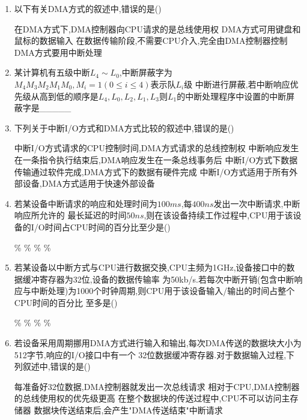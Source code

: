 \documentclass[12pt, a4paper, oneside, UTF8]{ctexbook}
\begin{document}
\begin{enumerate}
    \item 以下有关DMA方式的叙述中,错误的是() 
    \begin{choices}[1]
        \task 在DMA方式下,DMA控制器向CPU请求的是总线使用权 
        \task DMA方式可用键盘和鼠标的数据输入 
        \task 在数据传输阶段,不需要CPU介入,完全由DMA控制器控制 
        \task DMA方式要用中断处理 
    \end{choices}

    \item \bl 某计算机有五级中断$L_4\sim L_0$,中断屏蔽字为$M_4M_3M_2M_1M_0,M_i=1(0\leq i \leq 4)$表示队$L_i$级
    中断进行屏蔽,若中断响应优先级从高到低的顺序是$L_4,L_0,L_2,L_1,L_3$则$L_1$的中断处理程序中设置的中断屏蔽字是\_\_\_\_\_ 

    \item \bl 下列关于中断I/O方式和DMA方式比较的叙述中,错误的是() 
    \begin{choices}[1]
        \task 中断I/O方式请求的CPU控制时间,DMA方式请求的总线控制权 
        \task 中断响应发生在一条指令执行结束后,DMA响应发生在一条总线事务后 
        \task 中断I/O方式下数据传输通过软件完成,DMA方式下的数据有硬件完成 
        \task 中断I/O方式适用于所有外部设备,DMA方式适用于快速外部设备 
    \end{choices}

    \item \bl 若某设备中断请求的响应和处理时间为$100ms$,每$400ns$发出一次中断请求,中断响应所允许的
    最长延迟的时间$50ns$,则在该设备持续工作过程中,CPU用于该设备的I/O时间占CPU时间的百分比至少是() 
    \begin{choices}
        \% \% \% \%
    \end{choices}

    \item \bl 若某设备以中断方式与CPU进行数据交换,CPU主频为1GHz,设备接口中的数据缓冲寄存器为32位,设备的数据传输率
    为50kb/s.若每次中断开销(包含中断响应与中断处理)为1000个时钟周期,则CPU用于该设备输入/输出的时间占整个CPU时间的百分比
    至多是() 
    \begin{choices}
        \% \% \% \% 
    \end{choices}

    \item \bl 若设备采用周期挪用DMA方式进行输入和输出,每次DMA传送的数据块大小为512字节,响应的I/O接口中有一个
    32位数据缓冲寄存器.对于数据输入过程,下列叙述中,错误的是() 
    \begin{choices}[1]
        \task 每准备好32位数据,DMA控制器就发出一次总线请求 
        \task 相对于CPU,DMA控制器的总线使用权的优先级更高 
        \task 在整个数据块的传送过程中,CPU不可以访问主存储器
        \task 数据块传送结束后,会产生"DMA传送结束"中断请求
    \end{choices}


\end{enumerate}
\end{document}
